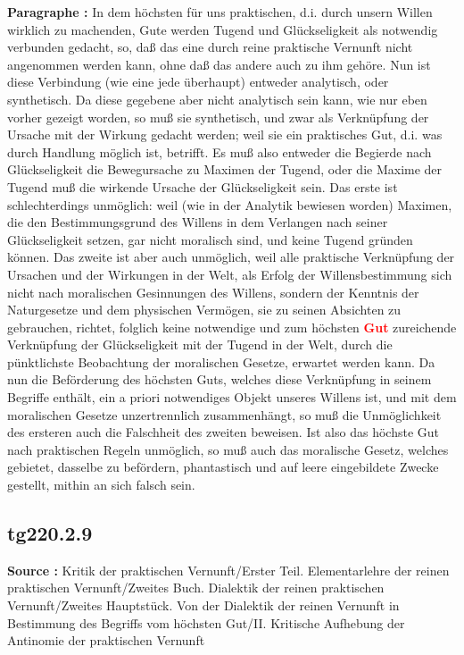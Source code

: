 \documentclass[a4paper,12pt,twoside]{book}
\newcommand{\match}[1]{\textcolor{red}{\textbf{#1}}}
\begin{document}
	\noindent\textbf{Paragraphe : }In dem höchsten für uns praktischen, d.i. durch unsern Willen wirklich zu machenden, Gute werden Tugend und Glückseligkeit als notwendig verbunden gedacht, so, daß das eine durch reine praktische Vernunft nicht angenommen werden kann, ohne daß das andere auch zu ihm gehöre. Nun ist diese Verbindung (wie eine jede überhaupt) entweder analytisch, oder synthetisch. Da diese gegebene aber nicht analytisch sein kann, wie nur eben vorher gezeigt worden, so muß sie synthetisch, und zwar als Verknüpfung der Ursache mit der Wirkung gedacht werden; weil sie ein praktisches Gut, d.i. was durch Handlung möglich ist, betrifft. Es muß also entweder die Begierde nach Glückseligkeit die Bewegursache zu Maximen der Tugend, oder die Maxime der Tugend muß die wirkende Ursache der Glückseligkeit sein. Das erste ist schlechterdings unmöglich: weil (wie in der Analytik bewiesen worden) Maximen, die den Bestimmungsgrund des Willens in dem Verlangen nach seiner Glückseligkeit setzen, gar nicht moralisch sind, und keine Tugend gründen können. Das zweite ist aber auch unmöglich, weil alle praktische Verknüpfung der Ursachen und der Wirkungen in der Welt, als Erfolg der Willensbestimmung sich nicht nach moralischen Gesinnungen des Willens, sondern der Kenntnis der Naturgesetze und dem physischen Vermögen, sie zu seinen Absichten zu gebrauchen, richtet, folglich keine notwendige und zum höchsten \match{Gut} zureichende Verknüpfung der Glückseligkeit mit der Tugend in der Welt, durch die pünktlichste Beobachtung der moralischen Gesetze, erwartet werden kann. Da nun die Beförderung des höchsten Guts, welches diese Verknüpfung in seinem Begriffe enthält, ein a priori notwendiges Objekt unseres Willens ist, und mit dem moralischen Gesetze unzertrennlich zusammenhängt, so muß die Unmöglichkeit des ersteren auch die Falschheit des zweiten beweisen. Ist also das höchste Gut nach praktischen Regeln unmöglich, so muß auch das moralische Gesetz, welches gebietet, dasselbe  zu befördern, phantastisch und auf leere eingebildete Zwecke gestellt, mithin an sich falsch sein. 
	
	\subsection*{tg220.2.9} 
	\textbf{Source : }Kritik der praktischen Vernunft/Erster Teil. Elementarlehre der reinen praktischen Vernunft/Zweites Buch. Dialektik der reinen praktischen Vernunft/Zweites Hauptstück. Von der Dialektik der reinen Vernunft in Bestimmung des Begriffs vom höchsten Gut/II. Kritische Aufhebung der Antinomie der praktischen Vernunft\\  
	
\end{document}
